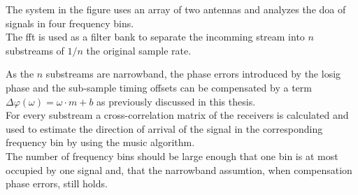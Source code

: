 The system in the figure uses an array of two antennas and
analyzes the \gls{doa} of signals in four frequency bins. \\

The \gls{fft} is used as a filter bank to
separate the incomming stream into $n$ substreams
of $1/n$ the original sample rate.

As the $n$ substreams are narrowband, the
phase errors introduced by the \gls{losig} phase
and the sub-sample timing offsets can be compensated
by a term $\Delta \varphi(\omega)= \omega \cdot m + b$
as previously discussed in this thesis. \\

For every substream a cross-correlation matrix
of the receivers is calculated and used to estimate
the direction of arrival of the signal in
the corresponding frequency bin by using
the \gls{music} algorithm. \\

The number of frequency bins should be large enough
that one bin is at most occupied by one signal and,
that the narrowband assumtion, when compensation
phase errors, still holds.
